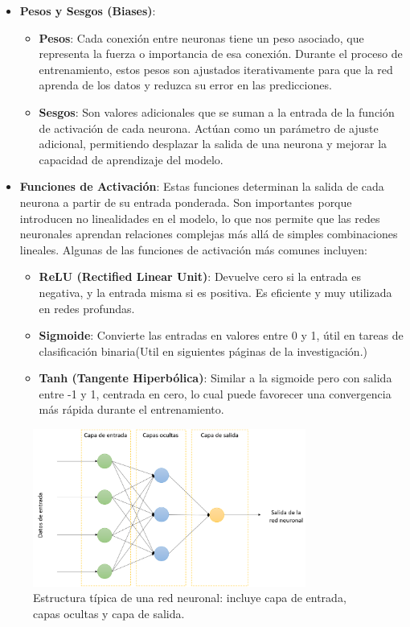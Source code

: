 \documentclass[11pt]{article} %
\begin{document}
\begin{itemize}
   \item\textbf{Pesos y Sesgos (Biases)}:
    \begin{itemize}
        \item \textbf{Pesos}: Cada conexión entre neuronas tiene un peso asociado, que representa la fuerza o importancia de esa conexión. Durante el proceso de entrenamiento, estos pesos son ajustados iterativamente para que la red aprenda de los datos y reduzca su error en las predicciones.
        \item \textbf{Sesgos}: Son valores adicionales que se suman a la entrada de la función de activación de cada neurona. Actúan como un parámetro de ajuste adicional, permitiendo desplazar la salida de una neurona y mejorar la capacidad de aprendizaje del modelo.
    \end{itemize}
    \item \textbf{Funciones de Activación}: Estas funciones determinan la salida de cada neurona a partir de su entrada ponderada. Son importantes porque introducen no linealidades en el modelo, lo que nos permite que las redes neuronales aprendan relaciones complejas más allá de simples combinaciones lineales. Algunas de las funciones de activación más comunes incluyen:
    \begin{itemize}
        \item \textbf{ReLU (Rectified Linear Unit)}: Devuelve cero si la entrada es negativa, y la entrada misma si es positiva. Es eficiente y muy utilizada en redes profundas.
        \item \textbf{Sigmoide}: Convierte las entradas en valores entre 0 y 1, útil en tareas de clasificación binaria(Util en siguientes páginas de la investigación.)
        \item \textbf{Tanh (Tangente Hiperbólica)}: Similar a la sigmoide pero con salida entre -1 y 1, centrada en cero, lo cual puede favorecer una convergencia más rápida durante el entrenamiento.
    \end{itemize}
\end{itemize}
\begin{figure}[H]
    \centering
    \includegraphics[width=0.8\textwidth]{Images/tutorial_ml_0215.png}
    \caption{Estructura típica de una red neuronal: incluye capa de entrada, capas ocultas y capa de salida.}
    \label{fig:estructura-red-neuronal}
\end{figure}
\end{document}
